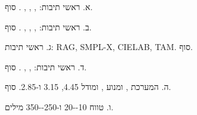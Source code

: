 \documentclass{auratwin-report}
\begin{document}
\mainmatterpages
א. ראשי תיבות: , , , . סוף.

ב. ראשי תיבות: , , , . סוף.

ג. ראשי תיבות: \mbox{\textenglish{RAG}}, \mbox{\textenglish{SMPL-X}}, \mbox{\textenglish{CIELAB}}, \mbox{\textenglish{TAM}}. סוף.

ד. ראשי תיבות:  ,  , . סוף.

ה. המערכת , ומנוע , ומודל \num{4.45}, \num{3.15} ו-\num{2.85}. סוף.

ו. טווח \num{10--20} ו-\num{250--350} מילים.
\bodyend
\end{document}

